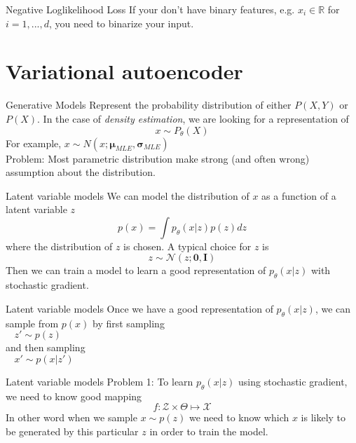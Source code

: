 \documentclass{beamer}
\newcommand{\real}{\mathbb{R}}
\begin{document}
\begin{frame}{Negative Loglikelihood Loss}
If your don't have binary features, e.g. $x_i\in \real$ for $i=1,...,d$, you need to binarize your input. 
\end{frame}

\section{Variational autoencoder}

\begin{frame}{Generative Models}
Represent the probability distribution of either $P(X,Y)$ or $P(X)$. In the case of \textit{density estimation}, we are looking for a representation of 
\huge
\[
	x \sim P_\theta(X)
\]
\normalsize
For example, $x\sim N(x;\bm{\mu}_{MLE}, \bm{\sigma}_{MLE})$ \\

Problem: Most parametric distribution make strong (and often wrong) assumption about the distribution.
\end{frame}

\begin{frame}{Latent variable models}
We can model the distribution of $x$ as a function of a latent variable $z$
\[
p(x) = \int p_\theta (x|z) p(z) dz
\]
where the distribution of $z$ is chosen. A typical choice for $z$ is 
\[
	z\sim \mathcal{N}(z;\bm{0}, \bm{I})
\]
Then we can train a model to learn a good representation of $p_\theta (x|z)$ with stochastic gradient.
\end{frame}

\begin{frame}{Latent variable models}
Once we have a good representation of $p_\theta (x|z)$, we can sample from $p(x)$ by first sampling \\

$~~~~z'\sim p(z)$\\

and then sampling\\

$~~~~x'\sim p(x|z')$ 
\end{frame}

\begin{frame}{Latent variable models}
Problem 1: To learn $p_\theta(x|z)$ using stochastic gradient, we need to know good mapping 
\[
	f: \mathcal{Z}\times \Theta \mapsto \mathcal{X}
\]
In other word when we sample $x\sim p(z)$ we need to know which $x$ is likely to be generated by this particular $z$ in order to train the model.
\end{frame}
\end{document}
